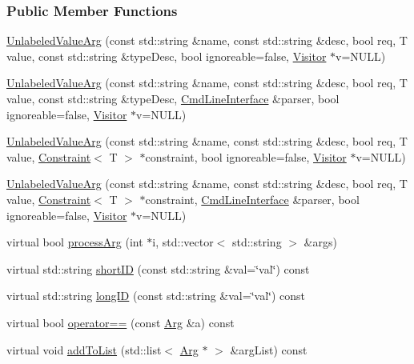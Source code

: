 \subsubsection*{Public Member Functions}
\begin{DoxyCompactItemize}
\item 
\hyperlink{classTCLAP_1_1UnlabeledValueArg_acba2fddd0719ccd90f48fcf06aaffbee}{Unlabeled\+Value\+Arg} (const std\+::string \&name, const std\+::string \&desc, bool req, T value, const std\+::string \&type\+Desc, bool ignoreable=false, \hyperlink{classTCLAP_1_1Visitor}{Visitor} $\ast$v=N\+U\+LL)
\item 
\hyperlink{classTCLAP_1_1UnlabeledValueArg_a9eafea8158d27a5af48e92f62debcf65}{Unlabeled\+Value\+Arg} (const std\+::string \&name, const std\+::string \&desc, bool req, T value, const std\+::string \&type\+Desc, \hyperlink{classTCLAP_1_1CmdLineInterface}{Cmd\+Line\+Interface} \&parser, bool ignoreable=false, \hyperlink{classTCLAP_1_1Visitor}{Visitor} $\ast$v=N\+U\+LL)
\item 
\hyperlink{classTCLAP_1_1UnlabeledValueArg_a2aa148ef6a2016bb3f32a33a7c644404}{Unlabeled\+Value\+Arg} (const std\+::string \&name, const std\+::string \&desc, bool req, T value, \hyperlink{classTCLAP_1_1Constraint}{Constraint}$<$ T $>$ $\ast$constraint, bool ignoreable=false, \hyperlink{classTCLAP_1_1Visitor}{Visitor} $\ast$v=N\+U\+LL)
\item 
\hyperlink{classTCLAP_1_1UnlabeledValueArg_afd3af78fccd14f2654e9b2f981ead12f}{Unlabeled\+Value\+Arg} (const std\+::string \&name, const std\+::string \&desc, bool req, T value, \hyperlink{classTCLAP_1_1Constraint}{Constraint}$<$ T $>$ $\ast$constraint, \hyperlink{classTCLAP_1_1CmdLineInterface}{Cmd\+Line\+Interface} \&parser, bool ignoreable=false, \hyperlink{classTCLAP_1_1Visitor}{Visitor} $\ast$v=N\+U\+LL)
\item 
virtual bool \hyperlink{classTCLAP_1_1UnlabeledValueArg_ad853d7950a659b0d4ee2cda3f61261fd}{process\+Arg} (int $\ast$i, std\+::vector$<$ std\+::string $>$ \&args)
\item 
virtual std\+::string \hyperlink{classTCLAP_1_1UnlabeledValueArg_abda4d1d695003ba165b6797e03007a99}{short\+ID} (const std\+::string \&val=\char`\"{}val\char`\"{}) const 
\item 
virtual std\+::string \hyperlink{classTCLAP_1_1UnlabeledValueArg_ade738f42a7867324ce780b0c240b0460}{long\+ID} (const std\+::string \&val=\char`\"{}val\char`\"{}) const 
\item 
virtual bool \hyperlink{classTCLAP_1_1UnlabeledValueArg_a74632cd4d169481518cb1a871f97b412}{operator==} (const \hyperlink{classTCLAP_1_1Arg}{Arg} \&a) const 
\item 
virtual void \hyperlink{classTCLAP_1_1UnlabeledValueArg_a8670fc7797254e602d302318063f3515}{add\+To\+List} (std\+::list$<$ \hyperlink{classTCLAP_1_1Arg}{Arg} $\ast$ $>$ \&arg\+List) const 
\end{DoxyCompactItemize}
